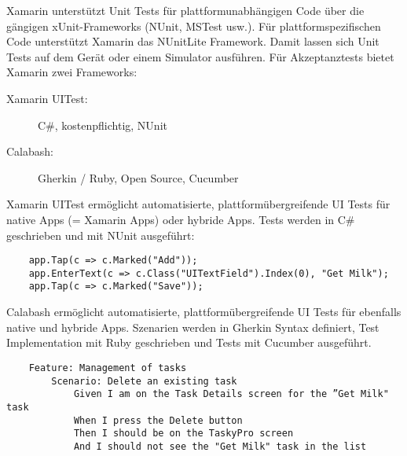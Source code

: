 Xamarin unterstützt Unit Tests für plattformunabhängigen Code über die gängigen xUnit-Frameworks (NUnit, MSTest usw.). Für plattformspezifischen Code unterstützt Xamarin das NUnitLite Framework. Damit lassen sich Unit Tests auf dem Gerät oder einem Simulator ausführen. Für Akzeptanztests bietet Xamarin zwei Frameworks:
\begin{description}
	\item[Xamarin UITest:] C\#, kostenpflichtig, NUnit
	\item[Calabash:] Gherkin / Ruby, Open Source, Cucumber
\end{description}
Xamarin UITest ermöglicht automatisierte, plattformübergreifende UI Tests für native Apps (= Xamarin Apps) oder hybride Apps. Tests werden in C\# geschrieben und mit NUnit ausgeführt:
\begin{verbatim}
	app.Tap(c => c.Marked("Add"));
	app.EnterText(c => c.Class("UITextField").Index(0), "Get Milk");
	app.Tap(c => c.Marked("Save"));
\end{verbatim}

Calabash ermöglicht automatisierte, plattformübergreifende UI Tests für ebenfalls native und hybride Apps. Szenarien werden in Gherkin Syntax definiert, Test Implementation mit Ruby geschrieben und Tests mit Cucumber ausgeführt.

\begin{verbatim}
	Feature: Management of tasks
		Scenario: Delete an existing task
			Given I am on the Task Details screen for the ”Get Milk" task
			When I press the Delete button
			Then I should be on the TaskyPro screen
			And I should not see the "Get Milk" task in the list
\end{verbatim}